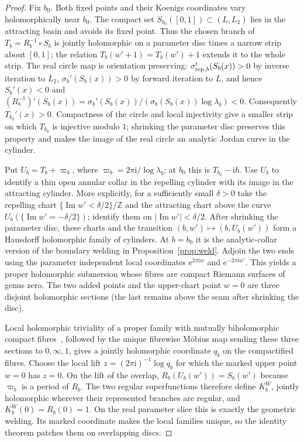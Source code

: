 \documentclass[11pt]{amsart}
\theoremstyle{definition}
\newcommand{\Rr}{R}
\newcommand{\Kk}{K}
\newcommand{\eee}{\mathrm{e}}
\newcommand{\ii}{\mathrm{i}}
\begin{document}
\begin{proof}
Fix $b_0$.  Both fixed points and their Koenigs coordinates vary
holomorphically near $b_0$.  The compact set
$S_{b_0}([0,1])\subset(L,L_2)$ lies in the attracting basin and avoids its
fixed point.  Thus the chosen branch of
$T_b=\Rr_b^{-1}\circ S_b$ is jointly holomorphic on a parameter disc times
a narrow strip about $[0,1]$; the relation $T_b(w'+1)=T_b(w')+1$
extends it to the whole strip.  The real circle map is orientation
preserving: $\sigma_{{\rm rep},b}'(S_b(x))>0$ by inverse iteration to $L_2$,
$\sigma_b'(S_b(x))>0$ by forward iteration to $L$, and hence
$S_b'(x)<0$ and
$(\Rr_b^{-1})'(S_b(x))=\sigma_b'(S_b(x))/
 (\sigma_b(S_b(x))\log\lambda_b)<0$.
Consequently $T_{b_0}'(x)>0$.  Compactness of the circle and local
injectivity give a smaller strip on which $T_{b_0}$ is injective modulo
$1$; shrinking the parameter disc preserves this property and makes the
image of the real circle an analytic Jordan curve in the cylinder.

Put $U_b=T_b+\varpi_b$, where
$\varpi_b=2\pi\ii/\log\lambda_b$; at $b_0$ this is $T_{b_0}-\ii h$.
Use $U_b$ to identify a thin open annular collar in the repelling
cylinder with its image in the attracting cylinder.  More explicitly,
for a sufficiently small $\delta>0$ take the repelling chart
$\{\operatorname{Im}w'<\delta/2\}/\mathbb Z$ and the attracting chart
above the curve $U_b(\{\operatorname{Im}w'=-\delta/2\})$; identify them
on $|\operatorname{Im}w'|<\delta/2$.  After shrinking the parameter disc,
these charts and the transition $(b,w')\mapsto(b,U_b(w'))$ form a
Hausdorff holomorphic family of cylinders.  At $b=b_0$ it is the
analytic-collar version of the boundary welding in
Proposition~\ref{prop:weld}.  Adjoin the two ends using the parameter
independent local coordinates $\eee^{2\pi\ii w}$ and
$\eee^{-2\pi\ii w'}$.  This yields a proper holomorphic submersion
whose fibres are compact Riemann surfaces of genus zero.  The two added
points and the upper-chart point $w=0$ are three disjoint holomorphic
sections (the last remains above the seam after shrinking the disc).

Local holomorphic triviality of a proper family with mutually
biholomorphic compact fibres~\cite{FischerGrauert1965}, followed by the
unique fibrewise M\"obius map sending these three sections to $0,\infty,1$,
gives a jointly holomorphic coordinate $q_b$ on the compactified fibres.
Choose the local lift $z=(2\pi\ii)^{-1}\log q_b$ for which the marked
upper point $w=0$ has $z=0$.  On the lift of the overlap,
$\Rr_b(U_b(w'))=S_b(w')$ because $\varpi_b$ is a period of $\Rr_b$.
The two regular superfunctions therefore define $\Kk_b^W$, jointly
holomorphic wherever their represented branches are regular, and
$\Kk_b^W(0)=\Rr_b(0)=1$.  On the real parameter slice this is exactly
the geometric welding.  Its marked coordinate makes the local families
unique, so the identity theorem patches them on overlapping discs.
\end{proof}
\end{document}
